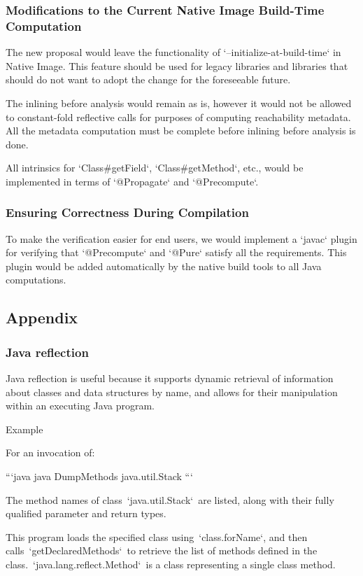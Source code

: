 \subsubsection{Modifications to the Current Native Image Build-Time Computation}

The new proposal would leave the functionality of `--initialize-at-build-time` in Native Image.
This feature should be used for legacy libraries and libraries that 
should do not want to adopt the change for the foreseeable future.

The inlining before analysis would remain as is, however 
it would not be allowed to constant-fold reflective calls for purposes 
of computing reachability metadata.
All the metadata computation must be complete before inlining before 
analysis is done.

All intrinsics for `Class#getField`, `Class#getMethod`, etc., would be implemented in terms of `@Propagate` and `@Precompute`.

\subsubsection{Ensuring Correctness During Compilation}

To make the verification easier for end users, we would implement a `javac` plugin for verifying that `@Precompute` and `@Pure` satisfy all the requirements. This plugin would be added automatically by the native build tools to all Java computations.

\subsection{Appendix}

\subsubsection{Java reflection}
Java reflection is useful because it supports dynamic retrieval of information about classes and data structures by name, and allows for their manipulation within an executing Java program.

Example

For an invocation of:

```java
java DumpMethods java.util.Stack
```

The method names of class `java.util.Stack` are listed, along with their fully qualified parameter and return types.

This program loads the specified class using `class.forName`, and then calls `getDeclaredMethods` to retrieve the list of methods defined in the class. `java.lang.reflect.Method` is a class representing a single class method.


